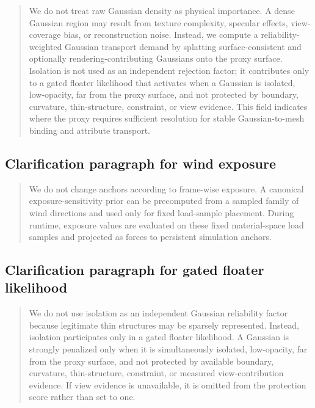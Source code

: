 \documentclass[11pt,a4paper]{article}
\begin{document}
\begin{quote}
We do not treat raw Gaussian density as physical importance. A dense Gaussian region may result from texture complexity, specular effects, view-coverage bias, or reconstruction noise. Instead, we compute a reliability-weighted Gaussian transport demand by splatting surface-consistent and optionally rendering-contributing Gaussians onto the proxy surface. Isolation is not used as an independent rejection factor; it contributes only to a gated floater likelihood that activates when a Gaussian is isolated, low-opacity, far from the proxy surface, and not protected by boundary, curvature, thin-structure, constraint, or view evidence. This field indicates where the proxy requires sufficient resolution for stable Gaussian-to-mesh binding and attribute transport.
\end{quote}

\subsection{Clarification paragraph for wind exposure}

\begin{quote}
We do not change anchors according to frame-wise exposure. A canonical exposure-sensitivity prior can be precomputed from a sampled family of wind directions and used only for fixed load-sample placement. During runtime, exposure values are evaluated on these fixed material-space load samples and projected as forces to persistent simulation anchors.
\end{quote}

\subsection{Clarification paragraph for gated floater likelihood}

\begin{quote}
We do not use isolation as an independent Gaussian reliability factor because legitimate thin structures may be sparsely represented. Instead, isolation participates only in a gated floater likelihood. A Gaussian is strongly penalized only when it is simultaneously isolated, low-opacity, far from the proxy surface, and not protected by available boundary, curvature, thin-structure, constraint, or measured view-contribution evidence. If view evidence is unavailable, it is omitted from the protection score rather than set to one.
\end{quote}
\end{document}
